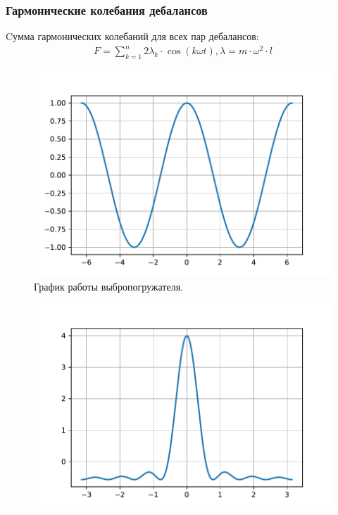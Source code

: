 \documentclass[10pt, pdf, hyperref={unicode}]{beamer}
\begin{document}
    \begin{frame}
        \frametitle{Гармонические колебания дебалансов}
        \begin{center}
            \begin{minipage}[h]{0.97\linewidth}
                Cумма гармонических колебаний для всех пар дебалансов:
                \begin{equation}\label{eq:harmonic_sum}
                    \begin{gathered}
                        F = \sum\limits_{k = 1}^n 2 \lambda_k \cdot \cos (k \omega t), \lambda = m \cdot \omega^2 \cdot l
                    \end{gathered}
                \end{equation}
                \begin{minipage}[h]{0.46\linewidth}
                    \begin{figure}[h]
                        \centering
                        \includegraphics[width=1\linewidth]{../grap/impulse_1.pdf}
                        \caption{График работы выбропогружателя.}
                    \end{figure}
                \end{minipage}
                \hfill
                \begin{minipage}[h]{0.46\linewidth}
                    \begin{figure}[h]
                        \centering
                        \includegraphics[width=1\linewidth]{../grap/impulse_7.pdf}

\end{figure}
\end{minipage}
\end{minipage}
\end{center}
\end{frame}
\end{document}
